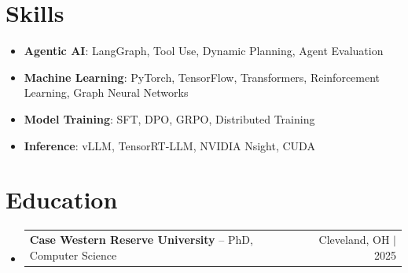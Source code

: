 \documentclass[letterpaper,13pt]{article}
\makeatletter
\newcommand{\resumeProjectHeading}[2]{
    \item
    \begin{tabular*}{\textwidth}{l@{\extracolsep{\fill}}r}
      \small#1 & #2 \\
    \end{tabular*}\vspace{-4pt}
}
\newcommand{\resumeSubHeadingListStart}{\begin{itemize}[leftmargin=0in, label={}]}
\newcommand{\resumeSubHeadingListEnd}{\end{itemize}}
\makeatother
\begin{document}
\section{Skills}
\vspace{0.02cm}
\begin{itemize}[leftmargin=0.15in, label={}, itemsep=2pt, topsep=1pt]
  \item \textbf{Agentic AI}: LangGraph, Tool Use, Dynamic Planning, Agent Evaluation
  \item \textbf{Machine Learning}: PyTorch, TensorFlow, Transformers, Reinforcement Learning, Graph Neural Networks
  \item \textbf{Model Training}: SFT, DPO, GRPO, Distributed Training
  \item \textbf{Inference}: vLLM, TensorRT-LLM, NVIDIA Nsight, CUDA
\end{itemize}
\vspace{0.02cm}

\section{Education}
\resumeSubHeadingListStart
  \resumeProjectHeading{\textbf{Case Western Reserve University} -- PhD, Computer Science}{Cleveland, OH $|$ 2025}
\resumeSubHeadingListEnd
\end{document}
